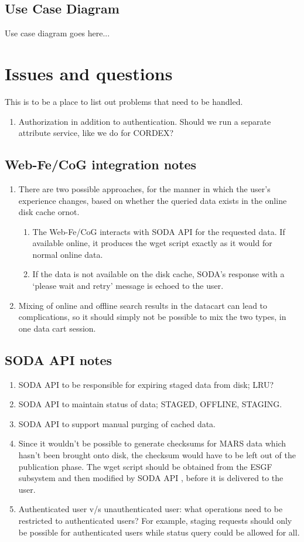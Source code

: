 \documentclass[oneside,12pt]{memoir}
\def\phname{SODA API{ }}
\begin{document}
\subsection{Use Case Diagram}
Use case diagram goes here...

\section{Issues and questions}
This is to be a place to list out problems that need to be handled.
\begin{enumerate}
\item Authorization in addition to authentication. Should we run a separate attribute service, like we do for CORDEX?
\end{enumerate}
\subsection{Web-Fe/CoG integration notes}
\begin{enumerate}
\item There are two possible approaches, for the manner in which the user's experience changes, based on whether the queried data exists in the online disk cache ornot.
\begin{enumerate}
\item The Web-Fe/CoG interacts with \phname for the requested data. If available online, it produces the wget script exactly as it would for normal online data.
\item If the data is not available on the disk cache, SODA’s response with a `please wait and retry' message is echoed to the user.
\end{enumerate}
\item Mixing of online and offline search results in the datacart can lead to complications, so it should simply not be possible to mix the two types, in one data cart session.
\end{enumerate}
\subsection{\phname notes}
\begin{enumerate}
\item \phname to be responsible for expiring staged data from disk; LRU?
\item \phname to maintain status of data; STAGED, OFFLINE, STAGING.
\item \phname to support manual purging of cached data.
\item Since it wouldn't be possible to generate checksums for MARS data which hasn't been
brought onto disk, the checksum would have to be left out of the publication phase.
The wget script should be obtained from the ESGF subsystem and then modiﬁed by \phname, before it is delivered to the user.
\item Authenticated user v/s unauthenticated user: what operations need to be restricted to authenticated users? For example, staging requests should only be possible for authenticated users while status query could be allowed for all.
\end{enumerate}
\end{document}
